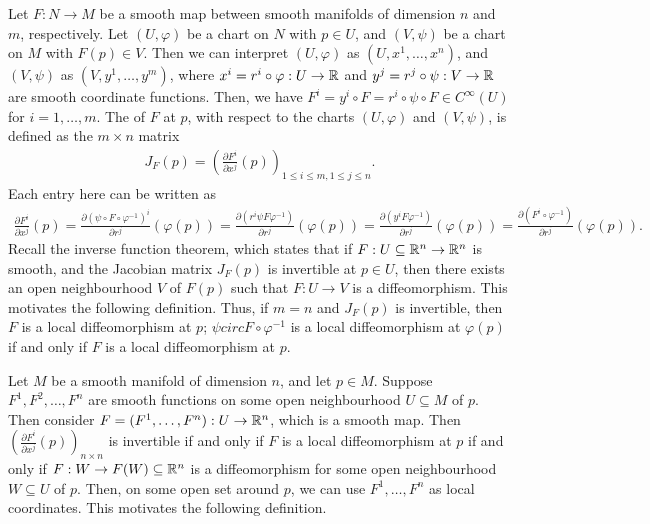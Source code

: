 Let $F:N \to M$ be a smooth map between smooth manifolds of dimension $n$ and $m$, respectively. Let $(U,\varphi)$ be a chart on $N$ with $p \in U$, and $(V,\psi)$ be a chart on $M$ with $F(p) \in V$. Then we can interpret $(U,\varphi)$ as $(U,x^{1},\ldots,x^{n})$, and $(V,\psi)$ as $(V,y^{1},\ldots,y^{m})$, where $x^{i} = r^{i} \circ \varphi:U \to \mathbb{R}$ and $y^{j} = r^{j} \circ \psi:V \to \mathbb{R}$ are smooth coordinate functions. Then, we have $F^{i} = y^{i} \circ F = r^{i} \circ \psi \circ F \in C^{\infty}(U)$ for $i = 1,\ldots,m$. The  of $F$ at $p$, with respect to the charts $(U,\varphi)$ and $(V,\psi)$, is defined as the $m \times n$ matrix
\begin{align}
    J_{F}(p) = \left( \frac{\partial F^{i}}{\partial x^{j}}(p) \right)_{1 \leq i \leq m, 1 \leq j \leq n}.
\end{align}
Each entry here can be written as
\begin{align}
    \frac{\partial F^{i}}{\partial x^{j}}(p) = \frac{\partial (\psi \circ F \circ \varphi^{-1})^{i}}{\partial r^{j}}(\varphi(p)) = \frac{\partial (r^{i}\psi F \varphi^{-1})}{\partial r^{j}}(\varphi(p)) = \frac{\partial(y^{i} F \varphi^{-1})}{\partial r^{j}}(\varphi(p)) = \frac{\partial(F^{i} \circ \varphi^{-1})}{\partial r^{j}}(\varphi(p)).
\end{align}
Recall the inverse function theorem, which states that if $F:U\subseteq\mathbb{R}^{n} \to \mathbb{R}^{n}$ is smooth, and the Jacobian matrix $J_{F}(p)$ is invertible at $p \in U$, then there exists an open neighbourhood $V$ of $F(p)$ such that $F:U \to V$ is a diffeomorphism. This motivates the following definition. Thus, if $m = n$ and $J_{F}(p)$ is invertible, then $F$ is a local diffeomorphism at $p$; $\psi circ F \circ \varphi^{-1}$ is a local diffeomorphism at $\varphi(p)$ if and only if $F$ is a local diffeomorphism at $p$.

Let $M$ be a smooth manifold of dimension $n$, and let $p \in M$. Suppose $F^{1},F^{2},\ldots,F^{n}$ are smooth functions on some open neighbourhood $U \subseteq M$ of $p$. Then consider $F = (F^{1},\ldots,F^{n}):U \to \mathbb{R}^{n}$, which is a smooth map. Then $\left(\frac{\partial F^{i}}{\partial x^{j}}(p)\right)_{n \times n}$ is invertible if and only if $F$ is a local diffeomorphism at $p$ if and only if $F:W \to F(W) \subseteq \mathbb{R}^{n}$ is a diffeomorphism for some open neighbourhood $W \subseteq U$ of $p$. Then, on some open set around $p$, we can use $F^{1},\ldots,F^{n}$ as local coordinates. This motivates the following definition.


